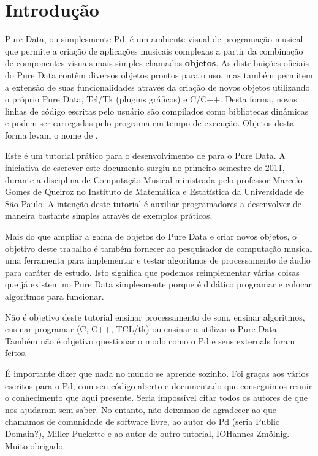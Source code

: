  
\chapter{Introdução}

Pure Data, ou simplesmente Pd, é um ambiente visual de programação musical que
permite a criação de aplicações musicais complexas a partir da combinação de
componentes visuais mais simples chamados \textbf{objetos}.
As distribuições oficiais do Pure Data contêm diversos objetos prontos para o
uso, mas também permitem a extensão de suas funcionalidades através da criação
de novos objetos utilizando o próprio Pure Data, Tcl/Tk (plugins gráficos) e C/C++.
Desta forma, novas linhas de código escritas pelo usuário são compilados como
bibliotecas dinâmicas e podem ser carregadas pelo programa em tempo de
execução.
Objetos desta forma levam o nome de \textbf{\externals}.

Este é um tutorial prático para o desenvolvimento de \externals para o
Pure Data.
A iniciativa de escrever este documento surgiu no primeiro semestre
de 2011, durante a disciplina de Computação Musical ministrada pelo professor
Marcelo Gomes de Queiroz no Instituto de Matemática e Estatística da
Universidade de São Paulo.
A intenção deste tutorial é auxiliar programadores a desenvolver \externals de
maneira bastante simples através de exemplos práticos.

Mais do que ampliar a gama de objetos do Pure Data e criar novos objetos, o
objetivo deste trabalho é também fornecer ao pesquisador de computação musical
uma ferramenta para implementar e testar algoritmos de processamento de áudio
para caráter de estudo.
Isto significa que podemos reimplementar várias coisas que já existem no Pure
Data simplesmente porque é didático programar e colocar algoritmos para
funcionar.

Não é objetivo deste tutorial ensinar processamento de som, ensinar algoritmos, 
ensinar programar (C, C++, TCL/tk) ou ensinar a utilizar o Pure Data.
Também não é objetivo questionar o modo como o Pd e seus externals foram feitos.


É importante dizer que nada no mundo se aprende sozinho.
Foi graças aos vários \externals escritos para o Pd, com seu código aberto e
documentado que conseguimos reunir o conhecimento que aqui presente.
Seria impossível citar todos os autores  de \externals que nos ajudaram sem
saber.
No entanto, não deixamos de agradecer ao que chamamos de comunidade de software
livre, ao autor do Pd (seria Public Domain?),  Miller Puckette e ao autor de
outro tutorial, IOHannes Zmölnig.
Muito obrigado.

